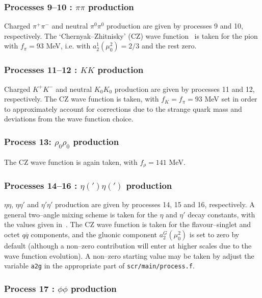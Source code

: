 \documentclass[12pt]{article}
\begin{document}
\subsubsection{Processes 9--10 : $\pi\pi$ production}

Charged $\pi^+\pi^-$ and neutral $\pi^0\pi^0$ production are given by processes 9 and 10, respectively. The `Chernyak--Zhitnisky' (CZ) wave 
function~\cite{Chernyak:1981zz} is taken for the pion with $f_\pi=93$ MeV, i.e. with $a_2^1(\mu_0^2)=2/3$ and the rest zero.

\subsubsection{Processes 11--12 : $KK$ production}

 Charged $K^+K^-$ and neutral $K_0K_0$ production are given by processes 11 and 12, respectively. The CZ wave function is taken, with 
 $f_K=f_\pi=93$ MeV set in order to approximately account for corrections due to the strange quark mass and deviations from the wave function choice.
 
 \subsubsection{Process 13: $\rho_0\rho_0$ production}
 
 The CZ wave function is again taken, with $f_\rho=141$ MeV.
 
 \subsubsection{Processes 14--16 : $\eta(')\eta(')$ production}

$\eta\eta$, $\eta\eta'$ and $\eta'\eta'$ production are given by processes 14, 15 and 16, respectively. A general two--angle mixing scheme is 
taken for the $\eta$ and $\eta'$ decay constants, with the values given in~\cite{Harland-Lang:2013ncy}. The CZ wave function is taken for the 
flavour--singlet and octet $q\overline{q}$ components, and the gluonic component $a_2^G(\mu_0^2)$ is set to zero by default (although a non--zero 
contribution will enter at higher scales due to the wave function evolution). A non--zero starting value may be taken by adjust the variable 
\texttt{a2g} in the appropriate part of \texttt{scr/main/process.f}.

\subsubsection{Process 17 : $\phi\phi$ production}
\end{document}
